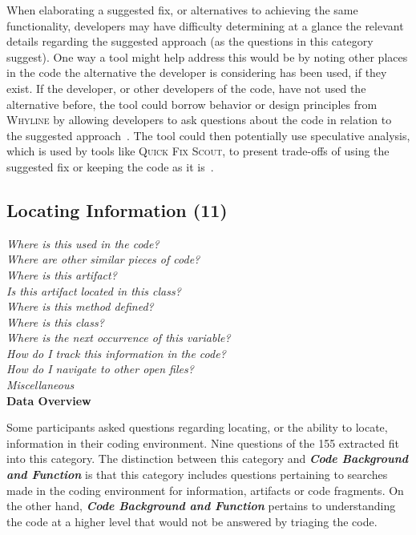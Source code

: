 \documentclass[conference]{IEEEtran}
\begin{document}
When elaborating a suggested fix, or alternatives to achieving the same functionality, developers may have difficulty determining at a glance the relevant details regarding the suggested approach (as the questions in this category suggest).
One way a tool might help address this would be by noting other places in the code the alternative the developer is considering has been used, if they exist. 
If the developer, or other developers of the code, have not used the alternative before, the tool could borrow behavior or design principles from \textsc{Whyline} by allowing developers to ask questions about the code in relation to the suggested approach~\cite{ko2004designing}. 
The tool could then potentially use speculative analysis, which is used by tools like \textsc{Quick Fix Scout}, to present trade-offs of using the suggested fix or keeping the code as it is~\cite{mucslu2012speculative}.



\noindent\subsection{\textbf{Locating Information (11)}}\label{li}

\noindent\emph{Where is this used in the code?} \\
\emph{Where are other similar pieces of code?} \\
\emph{Where is this artifact?} \\
\emph{Is this artifact located in this class?} \\
\emph{Where is this method defined?} \\
\emph{Where is this class? } \\
\emph{Where is the next occurrence of this variable?} \\
\emph{How do I track this information in the code?} \\
\emph{How do I navigate to other open files?} \\
\emph{Miscellaneous} \\

\noindent\textbf{Data Overview}

Some participants asked questions regarding locating, or the ability to locate, information in their coding environment. 
Nine questions of the 155 extracted fit into this category.
The distinction between this category and \emph{\textbf{Code Background and Function}} is that this category includes questions pertaining to searches made in the coding environment for information, artifacts or code fragments. 
On the other hand, \emph{\textbf{Code Background and Function}} pertains to understanding the code at a higher level that would not be answered by triaging the code.
\\
\end{document}
